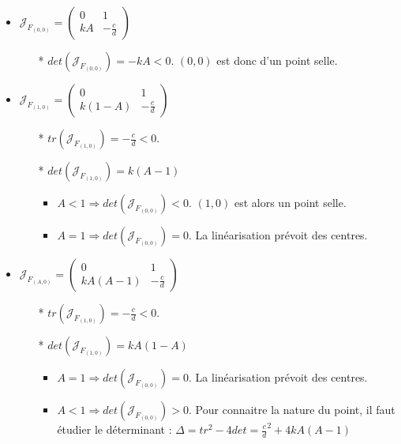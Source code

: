 \documentclass[a4paper,11pt]{article}
\begin{document}
\newline
\begin{itemize}[label=$\bullet$]
	\item$\mathcal{J}_{F_{(0,0)}}=\begin{pmatrix} 0 & 1 \\ kA & -\frac{c}{d} \end{pmatrix}$\\
    \begin{itemize}
		\item[*] $det (\mathcal{J}_{F_{(0,0)}}) = -kA <0$. $(0,0)$ est donc d'un point selle.
	\end{itemize}
    \item $\mathcal{J}_{F_{(1,0)}}=\begin{pmatrix} 0 & 1 \\ k(1-A) & -\frac{c}{d} \end{pmatrix}$\\
    \begin{itemize}
		\item[*] $tr (\mathcal{J}_{F_{(1,0)}})= -\frac{c}{d} <0$. 
        \item[*] $det (\mathcal{J}_{F_{(1,0)}}) = k(A-1)$
        \begin{itemize}[label=$\blacktriangleright$]
			\item $A<1 \Rightarrow det (\mathcal{J}_{F_{(0,0)}})<0$. $(1,0)$ est alors un point selle.
            \item $A=1 \Rightarrow det (\mathcal{J}_{F_{(0,0)}})=0$. La linéarisation prévoit des centres.
		\end{itemize}
	\end{itemize}
    \item $\mathcal{J}_{F_{(A,0)}}=\begin{pmatrix} 0 & 1 \\ kA(A-1) & -\frac{c}{d} \end{pmatrix}$\\
    \begin{itemize}
		\item[*] $tr (\mathcal{J}_{F_{(1,0)}})= -\frac{c}{d} <0$. 
        \item[*] $det (\mathcal{J}_{F_{(1,0)}}) = kA(1-A)$
        \begin{itemize}[label=$\blacktriangleright$]
            \item $A=1 \Rightarrow det (\mathcal{J}_{F_{(0,0)}})=0$. La linéarisation prévoit des centres.
            \item $A<1 \Rightarrow det (\mathcal{J}_{F_{(0,0)}})>0$. Pour connaitre la nature du point, il faut étudier le déterminant : $\Delta = tr^2 -4 det= \frac{c}{d}^2+4kA(A-1)$\\

\end{itemize}
\end{itemize}
\end{itemize}
\end{document}
